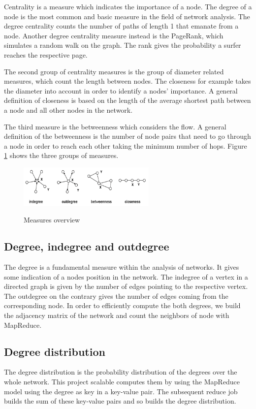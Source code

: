 Centrality is a measure which indicates the importance of a node. The degree of a node is the most common and basic measure in the field of network analysis. The degree centrality counts the number of paths of length 1 that emanate from a node. Another degree centrality measure instead is the PageRank, which simulates a random walk on the graph. The rank gives the probability a surfer reaches the respective page. 

The second group of centrality measures is the group of diameter related measures, which count the length between nodes. The closeness for example takes the diameter into account in order to identify a nodes’ importance. A general definition of closeness is based on the length of the average shortest path between a node and all other nodes in the network. 

The third measure is the betweenness which considers the flow. A general definition of the betweenness is the number of node pairs that need to go through a node in order to reach each other taking the minimum number of hops. Figure \ref{fig1} shows the three groups of measures.

\begin{figure}[H]
	\begin{center}
		\label{fig1}		
		\includegraphics[width=0.6\textwidth]{fig1}	
		\caption{Measures overview}	
	\end{center}
\end{figure}

\subsection{Degree, indegree and outdegree}
The degree is a fundamental measure within the analysis of networks. It gives some indication of a nodes position in the network. The indegree of a vertex in a directed graph is given by the number of edges pointing to the respective vertex. The outdegree on the contrary gives the number of edges coming from the corresponding node. In order to efficiently compute the both degrees, we build the adjacency matrix of the network and count the neighbors of node with MapReduce.

\subsection{Degree distribution}
The degree distribution is the probability distribution of the degrees over the whole network. This project scalable computes them by using the MapReduce model using the degree as key in a key-value pair. The subsequent reduce job builds the sum of these key-value pairs and so builds the degree distribution.

